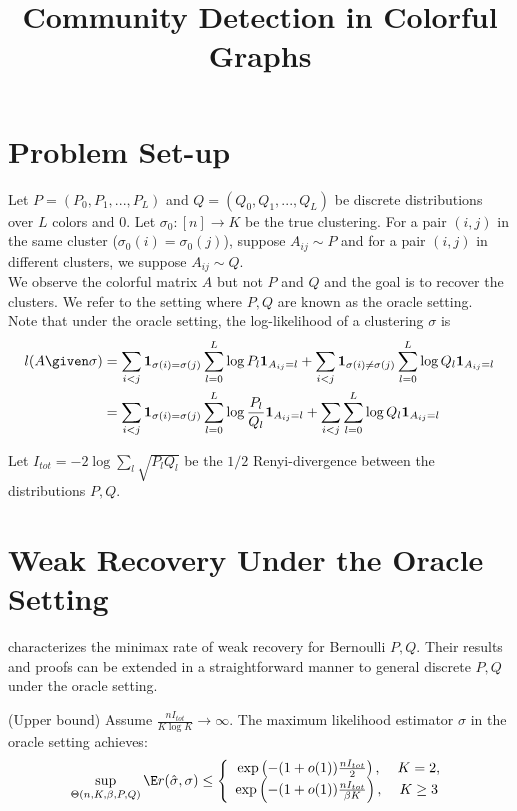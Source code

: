 \documentclass{article}
\begin{document}
\title{Community Detection in Colorful Graphs}
\maketitle

\section{Problem Set-up}

Let $P = (P_0, P_1, ..., P_L)$ and $Q = (Q_0, Q_1, ..., Q_L)$ be discrete distributions over $L$ colors and $0$. Let $\sigma_0 : [n] \rightarrow K$ be the true clustering. For a pair $(i,j)$ in the same cluster ($\sigma_0(i) = \sigma_0(j)$), suppose $A_{ij} \sim P$ and for a pair $(i,j)$ in different clusters, we suppose $A_{ij} \sim Q$. \\

We observe the colorful matrix $A$ but not $P$ and $Q$ and the goal is to recover the clusters. We refer to the setting where $P,Q$ are known as the oracle setting. \\

Note that under the oracle setting, the log-likelihood of a clustering $\sigma$ is 
\begin{align*}
l(A \given \sigma) &= 
  \sum_{i<j} \mathbf{1}_{\sigma(i) = \sigma(j)} \sum_{l=0}^L \log P_l \mathbf{1}_{A_{ij} = l} + 
  \sum_{i<j} \mathbf{1}_{\sigma(i)\neq\sigma(j)} \sum_{l=0}^L \log Q_l \mathbf{1}_{A_{ij} = l} \\
 &= \sum_{i<j} \mathbf{1}_{\sigma(i)=\sigma(j)} \sum_{l=0}^L \log \frac{P_l}{Q_l} \mathbf{1}_{A_{ij} = l} + \sum_{i<j} \sum_{l=0}^L \log Q_l \mathbf{1}_{A_{ij} = l} 
\end{align*}

Let $I_{tot} = -2 \log \sum_l \sqrt{P_l Q_l}$ be the $1/2$ Renyi-divergence between the distributions $P,Q$. 

\section{Weak Recovery Under the Oracle Setting}

\cite{zhangminimax} characterizes the minimax rate of weak recovery for Bernoulli $P,Q$. Their results and proofs can be extended in a straightforward manner to general discrete $P,Q$ under the oracle setting. 

\begin{proposition} (Upper bound)
Assume $\frac{n I_{tot}}{K \log K} \rightarrow \infty$. The maximum likelihood estimator $\hat{\sigma}$ in the oracle setting achieves:
\[
\sup_{\Theta(n, K, \beta, P, Q)} \E r(\hat{\sigma}, \sigma) \leq \left\{ 
    \begin{array}{cc} 
   \exp \left( - (1 + o(1)) \frac{nI_{tot}}{2} \right ), \, & K=2, \\
   \exp \left( - (1 + o(1)) \frac{nI_{tot}}{\beta K} \right ), \,& K\geq 3
  \end{array} \right. 
\]   
\end{proposition}
\end{document}
